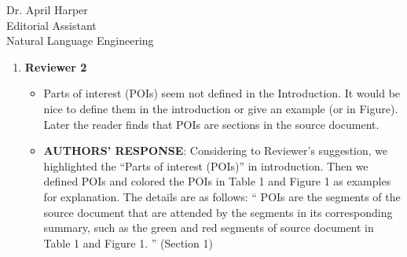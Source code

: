 \documentclass[11pt]{letter} %
\theoremstyle{definition}
\begin{document}
\begin{letter}{Dr. April Harper \\
            Editorial Assistant \\
			Natural Language Engineering}
\begin{enumerate}
\begin{itemize}
				
				\item The manuscript is overall clear and easy to follow, but following Reviewer 3's recommendation, I also recommend to proofread the manuscript thoroughly. Below I give just a few examples:
				 \begin{itemize}
				 \item[*] in abstract: ``reasons behind repetition problem'' $<-$ ``reasons behind the repetition problem'', ``prevent decoder'' $<-$ ``prevent the decoder'', etc.
				 \item[*]  in introduction: ``Recent study'' $<-$``A recent study'', ``due to its intrinsic'' $<-$ ``due to their intrinsic'', ``italized'' $<-$ ``italicized'', ``DivCNN row )'', etc.
				 \item[*]  There are many other missing articles and typos.
				 \end{itemize}
			   	\item[] \textbf{AUTHORS' RESPONSE}: 
                We corrected the grammatical and spelling mistakes mentioned in the comments.
                We also corrected other typos, such as ``second choices'' $->$ ``second choice'' in Section 2.3.
                
                Besides, we added the missing articles in Related Work (Section 4)
                as follows:
                
                ``
                ''
                


                
			\end{itemize}

			\item \textbf{Reviewer 2}
			\begin{itemize}
                \item Parts of interest (POIs) seem not defined in the Introduction. It would be nice to define them in the introduction or give an example (or in Figure). Later the reader finds that POIs are sections in the source document.
				\item[] \textbf{AUTHORS' RESPONSE}: 
                Considering to Reviewer's suggestion, we highlighted the ``Parts of interest (POIs)'' in introduction. Then we defined POIs and colored the POIs in Table 1 and Figure 1 as examples for explanation. The details are as follows:
                ``
                POIs are the segments of the source document that are attended by the segments in its corresponding summary, such as the green and red segments of source document in Table 1 and Figure 1.
                '' (Section 1)
                

\end{itemize}
\end{enumerate}
\end{letter}
\end{document}
